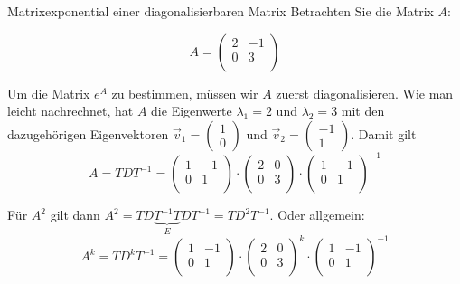 \begin{bsp}{Matrixexponential einer diagonalisierbaren Matrix}{}
	Betrachten Sie die  Matrix $A$:

	$$
		A = \begin{pmatrix}
			2 & -1 \\
			0 & 3  \\
		\end{pmatrix}
	$$

	Um die Matrix $e^A$ zu bestimmen, müssen wir $A$ zuerst diagonalisieren. Wie man leicht nachrechnet, hat $A$ die Eigenwerte $\lambda_1 = 2$ und $\lambda_2 = 3$ mit den dazugehörigen Eigenvektoren $\vec{v}_1 = \begin{pmatrix}
			1 \\ 0
		\end{pmatrix}$ und $\vec{v}_2 = \begin{pmatrix}
			-1 \\ 1
		\end{pmatrix}$. Damit gilt
	$$
		A = TDT^{-1} = \begin{pmatrix}
			1 & -1 \\
			0 & 1  \\
		\end{pmatrix} \cdot
		\begin{pmatrix}
			2 & 0 \\
			0 & 3 \\
		\end{pmatrix} \cdot
		\begin{pmatrix}
			1 & -1 \\
			0 & 1  \\
		\end{pmatrix}^{-1}
	$$

	Für $A^2$ gilt dann $A^2 = TD\underbrace{T^{-1} T}_{E} DT^{-1} = TD^2T^{-1}$. Oder allgemein:
	$$
		A^k =TD^kT^{-1}=
		\begin{pmatrix}
			1 & -1 \\
			0 & 1  \\
		\end{pmatrix} \cdot
		\begin{pmatrix}
			2 & 0 \\
			0 & 3 \\
		\end{pmatrix}^k \cdot
		\begin{pmatrix}
			1 & -1 \\
			0 & 1  \\
		\end{pmatrix}^{-1}
	$$


\end{bsp}
